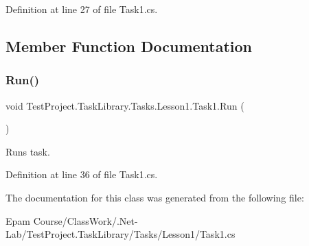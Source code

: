 Definition at line 27 of file Task1.\+cs.



\subsection{Member Function Documentation}
\mbox{\label{class_test_project_1_1_task_library_1_1_tasks_1_1_lesson1_1_1_task1_ad1fef5c532d4505f27bc8aa49ae7ec11}} 
\subsubsection{\texorpdfstring{Run()}{Run()}}
{\footnotesize\ttfamily void Test\+Project.\+Task\+Library.\+Tasks.\+Lesson1.\+Task1.\+Run (\begin{DoxyParamCaption}{ }\end{DoxyParamCaption})}



Runs task. 



Definition at line 36 of file Task1.\+cs.



The documentation for this class was generated from the following file\+:\begin{DoxyCompactItemize}
\item 
Epam Course/\+Class\+Work/.\+Net-\/\+Lab/\+Test\+Project.\+Task\+Library/\+Tasks/\+Lesson1/Task1.\+cs\end{DoxyCompactItemize}
